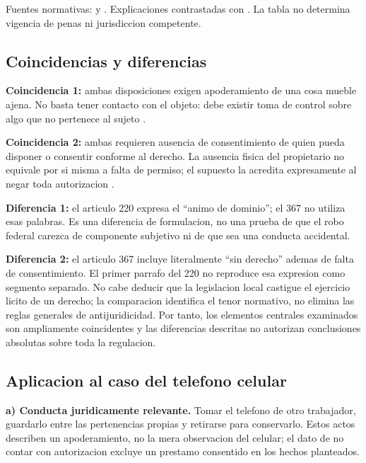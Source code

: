 \documentclass[spanish,letterpaper,oneside]{article}
\begin{document}
\begin{landscape}
Fuentes normativas: \citep[art.~367]{cpfAula2026} y
\citep[art.~220]{cpdfAulaS2}. Explicaciones contrastadas con
\citep{unadmPenalS2}. La tabla no determina vigencia de penas ni
jurisdiccion competente.
\endgroup
\end{landscape}

\subsection{Coincidencias y diferencias}\label{coincidencias-y-diferencias}

\textbf{Coincidencia 1:} ambas disposiciones exigen apoderamiento de una
cosa mueble ajena. No basta tener contacto con el objeto: debe existir
toma de control sobre algo que no pertenece al sujeto
\citep[art.~367]{cpfAula2026}\citep[art.~220]{cpdfAulaS2}.

\textbf{Coincidencia 2:} ambas requieren ausencia de consentimiento de
quien pueda disponer o consentir conforme al derecho. La ausencia fisica
del propietario no equivale por si misma a falta de permiso; el supuesto
la acredita expresamente al negar toda autorizacion
\citep[art.~367]{cpfAula2026}\citep[art.~220]{cpdfAulaS2}.

\textbf{Diferencia 1:} el articulo 220 expresa el ``animo de dominio'';
el 367 no utiliza esas palabras. Es una diferencia de formulacion, no
una prueba de que el robo federal carezca de componente subjetivo ni de
que sea una conducta accidental.

\textbf{Diferencia 2:} el articulo 367 incluye literalmente ``sin
derecho'' ademas de falta de consentimiento. El primer parrafo del 220
no reproduce esa expresion como segmento separado. No cabe deducir que
la legislacion local castigue el ejercicio licito de un derecho; la
comparacion identifica el tenor normativo, no elimina las reglas
generales de antijuridicidad. Por tanto, los elementos centrales
examinados son ampliamente coincidentes y las diferencias descritas no
autorizan conclusiones absolutas sobre toda la regulacion.

\subsection{Aplicacion al caso del telefono
celular}\label{aplicacion-al-caso-del-telefono-celular}

\textbf{a) Conducta juridicamente relevante.} Tomar el telefono de otro
trabajador, guardarlo entre las pertenencias propias y retirarse para
conservarlo. Estos actos describen un apoderamiento, no la mera
observacion del celular; el dato de no contar con autorizacion excluye
un prestamo consentido en los hechos planteados.
\end{document}
